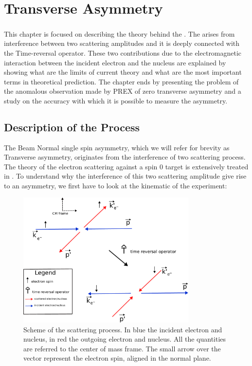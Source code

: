 
\chapter{Transverse Asymmetry} \label{transv}

\paragraph{}
This chapter is focused on describing the theory behind the \transv . The \transv arises from interference between two scattering amplitudes and it is deeply connected with the Time-reversal operator. These two contributions due to the electromagnetic interaction between the incident electron and the nucleus are explained by showing what are the limits of current theory and what are the most important terms in theoretical prediction. The chapter ends by presenting the problem of the anomalous observation made by PREX of zero transverse asymmetry and a study on the accuracy with which it is possible to measure the asymmetry. 

\section{Description of the Process}

The Beam Normal single spin asymmetry, which we will refer for brevity as Transverse asymmetry, originates from the interference of two scattering process. The theory of the electron scattering against a spin $0$ target is extensively treated in \cite{Gorchtein_2008}.
To understand why the interference of this two scattering amplitude give rise to an asymmetry, we first have to look at the kinematic of the experiment: 

\begin{figure}[hbtp]
\centering
\includegraphics[width = 0.8\textwidth]{Transverse/scattering.pdf}
\caption{Scheme of the scattering process. In blue the incident electron and nucleus, in red the outgoing electron and nucleus. All the quantities are referred to the center of mass frame. The small arrow over the vector represent the electron spin, aligned in the normal plane.}
\end{figure}

